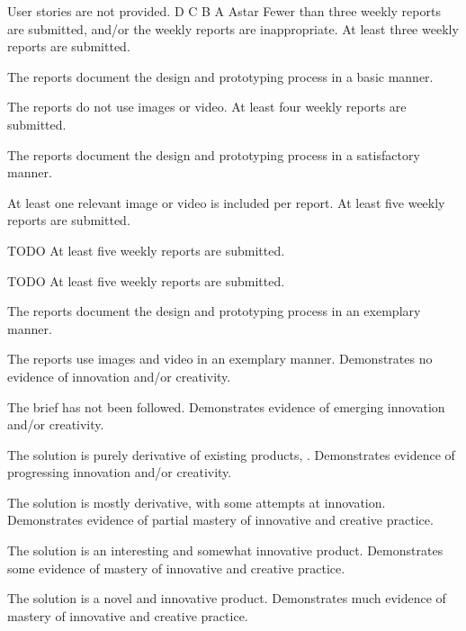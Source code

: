 \documentclass{../fal_assignment}
\begin{document}
\begin{markingrubric}
        \grade\fail User stories are not provided.
        \grade D
        \grade C
        \grade B
        \grade A
        \grade Astar
        \grade\fail Fewer than three weekly reports are submitted,
            and/or the weekly reports are inappropriate.
        \grade At least three weekly reports are submitted.
            \par The reports document the design and prototyping process in a basic manner.
            \par The reports do not use images or video.
        \grade At least four weekly reports are submitted.
            \par The reports document the design and prototyping process in a satisfactory manner.
            \par At least one relevant image or video is included per report.
        \grade At least five weekly reports are submitted.
            \par TODO
        \grade At least five weekly reports are submitted.
            \par TODO
        \grade At least five weekly reports are submitted.
            \par The reports document the design and prototyping process in an exemplary manner.
            \par The reports use images and video in an exemplary manner.
        \grade\fail Demonstrates no evidence of innovation and/or creativity.
            \par The brief has not been followed.
        \grade Demonstrates evidence of emerging innovation and/or creativity.
            \par The solution is purely derivative of existing products, .
        \grade Demonstrates evidence of progressing innovation and/or creativity.
            \par The solution is mostly derivative, with some attempts at innovation.
        \grade Demonstrates evidence of partial mastery of innovative and creative practice.
            \par The solution is an interesting and somewhat innovative product.
        \grade Demonstrates some evidence of mastery of innovative and creative practice.
            \par The solution is a novel and innovative product.
        \grade Demonstrates much evidence of mastery of innovative and creative practice.

\end{markingrubric}
\end{document}
